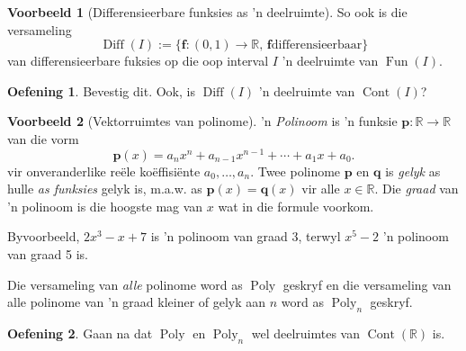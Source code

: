 \documentclass[a4paper,11pt]{book}
\theoremstyle{definition}
\newtheorem{exercise}{Oefening}
\newtheorem{example_environment}{Voorbeeld}[chapter]
\newcommand{\be}{\begin{equation}}
\newcommand{\ee}{\end{equation}}
\newcommand{\ve}[1]{\mathbf{#1}}
\newenvironment{example}
	{
		\begin{oframed}
		\begin{example_environment}
	}
	{
		\end{example_environment}
		\end{oframed}
	}
\DeclareMathOperator{\Fun}{Fun}
\DeclareMathOperator{\Cont}{Cont}
\DeclareMathOperator{\Diff}{Diff}
\DeclareMathOperator{\Poly}{Poly}
\begin{document}
\begin{example}[Differensieerbare funksies as 'n deelruimte] So ook is die
	versameling
	\[
		\Diff(I) := \{ \ve{f}: (0,1) \rightarrow \mathbb{R}, \, \ve{f}
		\mbox{differensieerbaar} \}
	\]
	van differensieerbare fuksies op die oop interval $I$ 'n deelruimte van
	$\Fun (I)$.
	\begin{exercise}
		Bevestig dit. Ook, is $\Diff( I)$ 'n deelruimte van $\Cont(I)$?
	\end{exercise}
\end{example}

\begin{example}[Vektorruimtes van polinome] 
	'n \emph{Polinoom} is 'n funksie $\ve{p} : \mathbb{R}
	\rightarrow \mathbb{R}$ van die vorm
	\be
	\ve{p}(x) = a_n x^n + a_{n-1}x^{n-1} + \cdots + a_1 x + a_0.
	\label{formula_poly}
	\ee
	vir onveranderlike re{\"e}le ko{\"e}ffisi{\"e}nte $a_0, \ldots, a_n$.
	Twee polinome $\ve{p}$ en $\ve{q}$ is \emph{gelyk} as hulle \emph{as
	funksies} gelyk is, m.a.w. as $\ve{p}(x) = \ve{q} (x)$ vir alle $x \in
	\mathbb{R}$. Die \emph{graad} van 'n polinoom is die hoogste mag van
	$x$ wat in die formule voorkom.

	Byvoorbeeld, $2x^3 - x + 7$ is 'n polinoom van graad 3, terwyl $x^5 -
	2$ 'n polinoom van graad 5 is.
	
	Die versameling van \emph{alle} polinome word as $\Poly$
	geskryf en die versameling van alle polinome van 'n graad kleiner of
	gelyk aan $n$ word as $\Poly_n$ geskryf.

	\begin{exercise}
		Gaan na dat $\Poly$ en $\Poly_n$ wel deelruimtes van $\Cont
		(\mathbb{R})$ is.
	\end{exercise}
\end{example}
\end{document}

